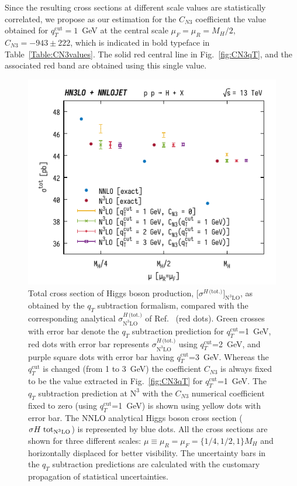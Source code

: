 \documentclass[12pt]{article}
\DeclareRobustCommand{\qt}{\ensuremath{q_T}\xspace}
\DeclareRobustCommand{\qtcut}{\ensuremath{q_T^\mathrm{cut}}\xspace}
\DeclareRobustCommand{\tot}{\text{(tot.)}\xspace}
\DeclareRobustCommand{\LO}{\text{LO}\xspace}
\DeclareRobustCommand{\N}[1]{\ensuremath{\text{N}^{#1}}} %
\begin{document}
Since the resulting cross sections at different scale values are statistically correlated, we propose as our estimation for the $C_{N3}$ coefficient the value obtained for  $\qtcut=1$~GeV   at the central scale $\mu_F=\mu_R=M_{H}/2$, $C_{N3}=-943 \pm 222$, which is indicated in bold typeface in Table~\ref{Table:CN3values}.
The solid red central line in Fig.~\ref{fig:CN3qT}, and the associated red band are obtained using this single value. 

\begin{figure}
\centering
\includegraphics[width=.6\linewidth]{./new_figures/totXsecN3LO}
\caption{\label{fig:totXsecN3LO}{Total cross section of Higgs boson production, $\bigl[\sigma^{H\,\tot}\bigr]_{\N{3}\LO}$, as obtained by the $\qt$ subtraction formalism, compared with the corresponding analytical $\sigma^{H\,\tot}_{\N3\LO}$ of Ref.~\cite{Mistlberger:2018etf} (red dots). Green crosses with error bar denote the $\qt$ subtraction prediction for $\qtcut$=1~GeV, red dots with error bar represents  $\sigma^{H\,\tot}_{\N3\LO}$ using $\qtcut$=2~GeV, and purple square dots with error bar having $\qtcut$=3~GeV. Whereas the $\qtcut$ is changed (from 1 to 3~GeV) the coefficient $C_{N3}$ is always fixed to be the value extracted in Fig.~\ref{fig:CN3qT} for $\qtcut$=1~GeV. The $\qt$ subtraction prediction at \N3\LO with the $C_{N3}$ numerical coefficient fixed to zero (using $\qtcut$=1~GeV) is shown using yellow dots with error bar. The NNLO analytical Higgs boson cross section ($\sigma{{H\;\rm {tot}}}_{\N3\LO}$) is represented by blue dots. All the cross sections are shown for three different scales: $\mu \equiv \mu_R = \mu_F = \{1/4,1/2,1 \} M_H$ and horizontally displaced for better visibility. The uncertainty bars in the $\qt$ subtraction predictions are calculated with the customary propagation of statistical uncertainties.}}
\end{figure}
\end{document}
